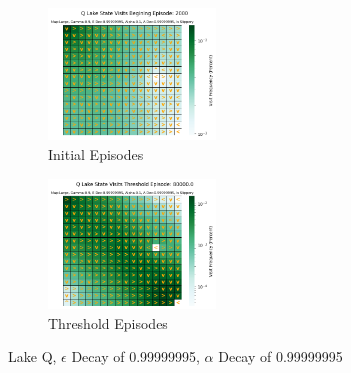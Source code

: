 \documentclass[letterpaper]{article} %
\begin{document}
\begin{figure}[!htb]
	\begin{subfigure}[b]{0.25\textwidth}
		\centering
		\includegraphics[width=1.75in]{Figures/Q_Lake_State_Visits_Begining_Episode__2000_Map_Large__Gamma_0_9__E_Dec_0_99999995__Alpha_0_1__A_Dec_0_99999995__Is_Slippery.png}
		\caption{Initial Episodes}
  	\end{subfigure}%
	\begin{subfigure}[b]{0.25\textwidth}
		\centering
		\includegraphics[width=1.75in]{Figures/Q_Lake_State_Visits_Threshold_Episode__80000_0_Map_Large__Gamma_0_9__E_Dec_0_99999995__Alpha_0_1__A_Dec_0_99999995__Is_Slippery.png}
		\caption{Threshold Episodes}
  	\end{subfigure}%
\caption{Lake Q,  $\epsilon$ Decay of 0.99999995, $\alpha$ Decay of 0.99999995}
\label{fig:lake_q_e_99999995_a_99999995_maps}
\end{figure}
\end{document}
